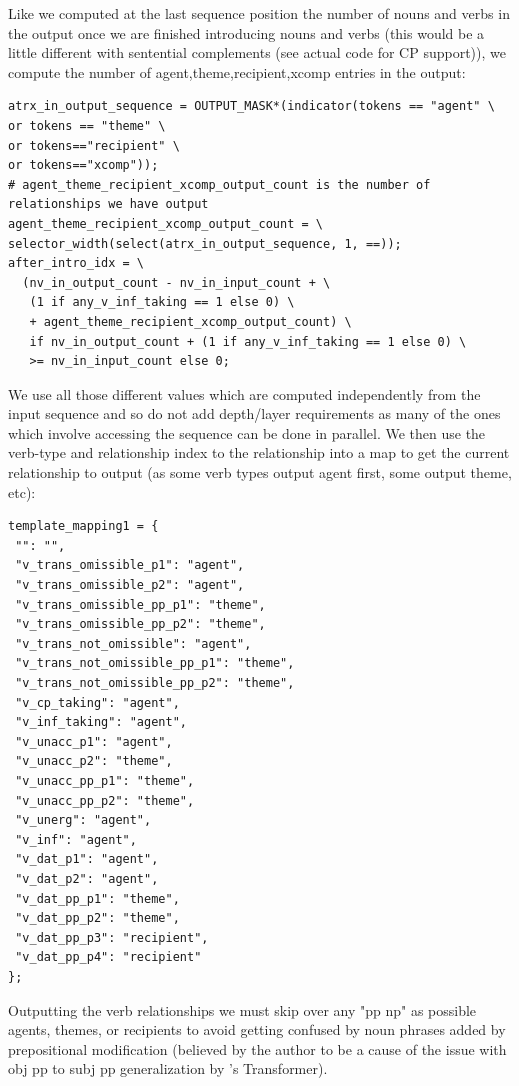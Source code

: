 \documentclass[11pt]{article}
\begin{document}
Like we computed at the last sequence position the number of nouns and verbs in the output once we are finished introducing nouns and verbs (this would be a little different with sentential complements (see actual code for CP support)), we compute the number of agent,theme,recipient,xcomp entries in the output:
\begin{tiny}
\begin{verbatim}
atrx_in_output_sequence = OUTPUT_MASK*(indicator(tokens == "agent" \
or tokens == "theme" \
or tokens=="recipient" \
or tokens=="xcomp"));
# agent_theme_recipient_xcomp_output_count is the number of relationships we have output
agent_theme_recipient_xcomp_output_count = \
selector_width(select(atrx_in_output_sequence, 1, ==));
after_intro_idx = \
  (nv_in_output_count - nv_in_input_count + \
   (1 if any_v_inf_taking == 1 else 0) \
   + agent_theme_recipient_xcomp_output_count) \
   if nv_in_output_count + (1 if any_v_inf_taking == 1 else 0) \
   >= nv_in_input_count else 0;
\end{verbatim}
\end{tiny}
\clearpage
We use all those different values which are computed independently from the input sequence and so do not add depth/layer requirements as many of the ones which involve accessing the sequence can be done in parallel. 
We then use the verb-type and relationship index to the relationship into a map to get the current relationship to output (as some verb types output agent first, some output theme, etc):
\begin{tiny}
\begin{verbatim}
template_mapping1 = {
 "": "",
 "v_trans_omissible_p1": "agent",
 "v_trans_omissible_p2": "agent",
 "v_trans_omissible_pp_p1": "theme",
 "v_trans_omissible_pp_p2": "theme",
 "v_trans_not_omissible": "agent",
 "v_trans_not_omissible_pp_p1": "theme",
 "v_trans_not_omissible_pp_p2": "theme",
 "v_cp_taking": "agent",
 "v_inf_taking": "agent",
 "v_unacc_p1": "agent",
 "v_unacc_p2": "theme",
 "v_unacc_pp_p1": "theme",
 "v_unacc_pp_p2": "theme",
 "v_unerg": "agent",
 "v_inf": "agent",
 "v_dat_p1": "agent",
 "v_dat_p2": "agent",
 "v_dat_pp_p1": "theme",
 "v_dat_pp_p2": "theme",
 "v_dat_pp_p3": "recipient",
 "v_dat_pp_p4": "recipient"
};
\end{verbatim}
\end{tiny}

Outputting the verb relationships we must skip over any "pp np" as possible agents, themes, or recipients to avoid getting confused by noun phrases added by prepositional modification (believed by the author to be a cause of the issue with obj pp to subj pp generalization by \citep{Wu2023}'s Transformer).
\end{document}
